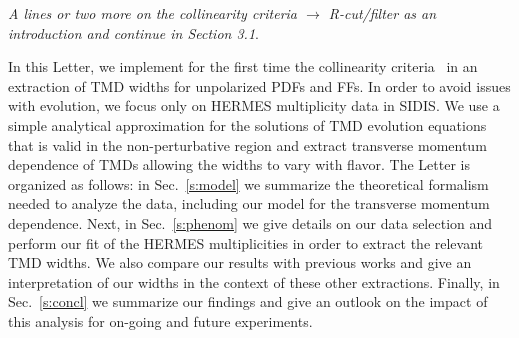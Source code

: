 \documentclass[final,3p,times,onecolumn,sort&compress,hidelinks]{elsarticle}
\newcommand\3[1]{\boldsymbol{#1}}
\begin{document}
\begin{flushleft}  
  {\em A lines or two more on the collinearity criteria $\rightarrow$ R-cut/filter as an introduction and continue in Section 3.1}.
  \end{flushleft}

  
In this Letter, we  implement for the first time the collinearity criteria~\cite{Boglione:2016bph} in an extraction of TMD widths for unpolarized PDFs and FFs.  In order to avoid issues with evolution, we focus only on HERMES multiplicity data in SIDIS.  We use a simple analytical approximation for the solutions of TMD evolution equations that is valid in the non-perturbative region and  extract transverse momentum dependence of TMDs allowing the widths to vary with flavor.  The Letter is organized as follows: in Sec.~\ref{s:model} we summarize the theoretical formalism needed to analyze the data, including our model for the transverse momentum dependence.  Next, in Sec.~\ref{s:phenom} we give details on our data selection and perform our fit of the HERMES multiplicities in order to extract the relevant TMD widths.  We also compare our results with previous works and give an interpretation of our widths in the context of these other extractions.  Finally, in Sec.~\ref{s:concl} we summarize our findings and give an outlook on the impact of this analysis for on-going and future experiments.
\end{document}
